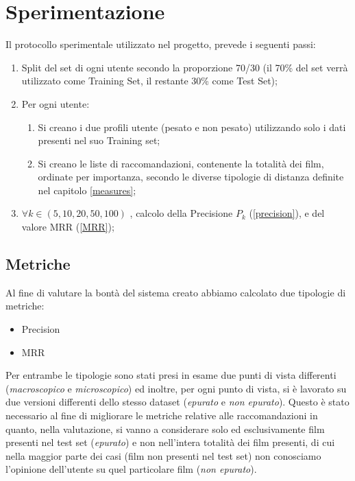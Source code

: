 \section{Sperimentazione}
\label{experiment}

Il protocollo sperimentale utilizzato nel progetto, prevede i seguenti passi:
\begin{enumerate}
\item Split del set di ogni utente secondo la proporzione 70/30 (il 70\% del set verrà utilizzato come Training Set, il restante 30\% come Test Set);
\item Per ogni utente:
    \begin{enumerate}
        \item Si creano i due profili utente (pesato e non pesato) utilizzando solo i dati presenti nel suo Training set;
        \item Si creano le liste di raccomandazioni, contenente la totalità dei film, ordinate per importanza, secondo le diverse tipologie di distanza definite nel capitolo \ref{measures};
    \end{enumerate}
\item $\forall k \in (5,10,20,50,100)$ , calcolo della Precisione $P_k$ (\ref{precision}), e del valore MRR (\ref{MRR});
\end{enumerate}

\subsection{Metriche}
\label{metriche}
Al fine di valutare la bontà del sistema creato abbiamo calcolato due tipologie di metriche:
\begin{itemize}
\item Precision
\item MRR
\end{itemize}
Per entrambe le tipologie sono stati presi in esame due punti di vista differenti (\emph{macroscopico} e \emph{microscopico}) ed inoltre, per ogni punto di vista, si è lavorato su due versioni differenti dello stesso dataset (\emph{epurato} e \emph{non epurato}). Questo è stato necessario al fine di migliorare le metriche relative alle raccomandazioni in quanto, nella valutazione, si vanno a considerare solo ed esclusivamente film presenti nel test set (\emph{epurato}) e non nell'intera totalità dei film presenti, di cui nella maggior parte dei casi (film non presenti nel test set) non conosciamo l'opinione dell'utente su quel particolare film (\emph{non epurato}).

